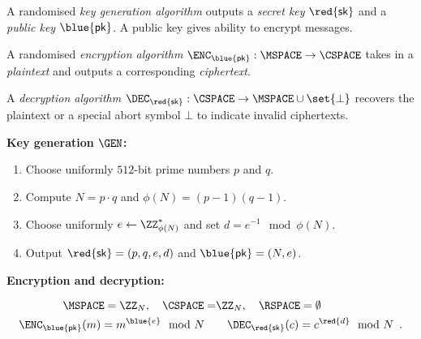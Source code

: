 \documentclass[landscape,footrule]{foils}
\renewcommand{\SK}{{\red{\mathsf{sk}}}}
\renewcommand{\PK}{{\blue{\mathsf{pk}}}}
\begin{document}
\titlefoil
{}



\vspace*{1ex}
\begin{triangles}
\item A randomised \emph{key generation algorithm} outputs a
  \emph{secret key} $\SK$ and a \emph{public key} $\PK$. A public
  key gives ability to encrypt messages.
\item A randomised \emph{encryption algorithm}
  $\ENC_\PK:\MSPACE\to\CSPACE$ takes in a \emph{plaintext} and
  outputs a corresponding \emph{ciphertext}.
\item A \emph{decryption algorithm}
  $\DEC_\SK:\CSPACE\to\MSPACE\cup\set{\bot}$ recovers the plaintext or
  a special abort symbol $\bot$ to indicate invalid ciphertexts.
\end{triangles}






\textbf{Key generation $\GEN$:}
\begin{enumerate}
\item Choose uniformly $512$-bit prime numbers $p$ and $q$.
\item Compute $N=p\cdot q$ and $\phi(N)=(p-1)(q-1)$.
\item Choose uniformly $e\gets\ZZ_{\phi(N)}^*$ and set $d=e^{-1}\mod \phi(N)$.
\item Output $\SK=(p,q,e,d)$ and $\PK=(N,e)$.
\end{enumerate}

\vskip 1cm
\textbf{Encryption and decryption:}

\begin{align*}
 \MSPACE=\ZZ_N,\quad \CSPACE=&\ZZ_N,\quad \RSPACE=\emptyset\\
\ENC_\PK(m)=m^{\blue{e}}\mod N\quad&\quad\DEC_\SK(c)=c^{\red{d}}\mod N\enspace.
\end{align*}




 
\enlargethispage{2cm}
\end{document}
